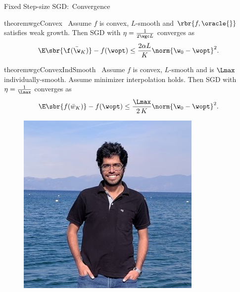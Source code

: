 \documentclass[mathserif,notheorems, hyperref={colorlinks, citecolor=blue, urlcolor=blue, linkcolor=blue}]{beamer}
\begin{document}
    \begin{frame}{Fixed Step-size SGD:\ Convergence}
        \vspace{-2ex}
        \begin{minipage}[t]{0.82\textwidth}
        \vspace{-1.45ex} 
        \begin{restatable}{theorem}{wgcConvex}~\label{thm:wgc-convex}
            Assume \( f \) is convex, \( L \)-smooth and \( \rbr{f, \oracle{}} \) satisfies weak growth. 
            Then SGD with \( \eta = \frac{1}{2 \wgc L} \) converges as
            \[ \E\sbr{\f(\bar \w_K)} - f(\wopt) \leq \frac{2 \alpha L}{K} \norm{\w_0 - \wopt}^2. \]
        \end{restatable}

        \begin{restatable}{theorem}{wgcConvexIndSmooth}~\label{thm:wgc-convex-ind-smooth}
            Assume \( f \) is convex, \( L \)-smooth and \oracle{} is \( \Lmax \) individually-smooth. 
            Assume minimizer interpolation holds. 
            Then SGD with \( \eta = \frac{1}{\Lmax} \) converges as
            \[ \E\sbr{f(\bar w_K)} - f(\wopt) \leq \frac{\Lmax}{2 \, K} \norm{\w_0 - \wopt}^2.   \]
        \end{restatable}

        \end{minipage} 
        \begin{minipage}[t]{0.15\textwidth}
            \begin{figure}[t]
                \centering
                \includegraphics[width=0.8\textwidth]{collaborators/sharan}


\end{figure}
\end{minipage}
\end{frame}
\end{document}
